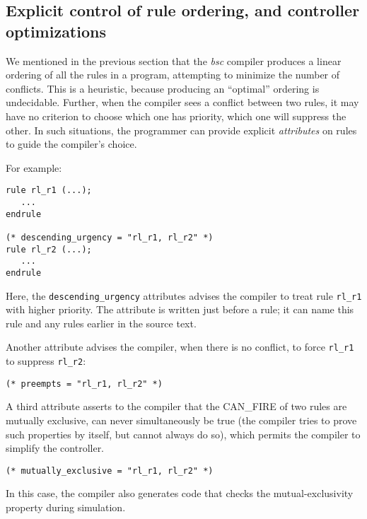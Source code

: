 \subsection{Explicit control of rule ordering, and controller optimizations}

We mentioned in the previous section that the \emph{bsc} compiler
produces a linear ordering of all the rules in a program, attempting
to minimize the number of conflicts.  This is a heuristic, because
producing an ``optimal'' ordering is undecidable.  Further, when the
compiler sees a conflict between two rules, it may have no criterion
to choose which one has priority, {\ie} which one will suppress the
other.  In such situations, the {\BSV} programmer can provide explicit
\emph{attributes} on rules to guide the compiler's choice.

For example:

{\footnotesize
\begin{Verbatim}[frame=single,label=BSV]
rule rl_r1 (...);
   ...
endrule

(* descending_urgency = "rl_r1, rl_r2" *)
rule rl_r2 (...);
   ...
endrule
\end{Verbatim}
}

Here, the \verb|descending_urgency| attributes advises the compiler to
treat rule \verb|rl_r1| with higher priority.  The attribute is
written just before a rule; it can name this rule and any rules
earlier in the source text.

Another attribute advises the compiler, when there is no conflict, to
force \verb|rl_r1| to suppress \verb|rl_r2|:

{\footnotesize
\begin{Verbatim}[frame=single,label=BSV]
(* preempts = "rl_r1, rl_r2" *)
\end{Verbatim}
}

A third attribute asserts to the compiler that the CAN\_FIRE of two
rules are mutually exclusive, {\ie} can never simultaneously be true
(the compiler tries to prove such properties by itself, but cannot
always do so), which permits the compiler to simplify the controller.

{\footnotesize
\begin{Verbatim}[frame=single,label=BSV]
(* mutually_exclusive = "rl_r1, rl_r2" *)
\end{Verbatim}
}

In this case, the compiler also generates code that checks the
mutual-exclusivity property during simulation.

